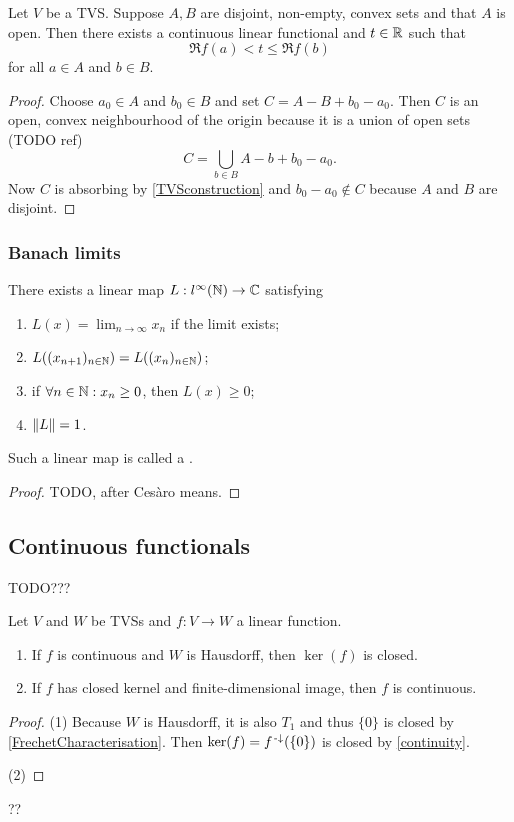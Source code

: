 \begin{proposition}
Let $V$ be a TVS. Suppose $A,B$ are disjoint, non-empty, convex sets and that $A$ is open. Then there exists a continuous linear functional and $t\in \mathbb{R}$ such that
\[ \Re f(a) < t \leq \Re f(b) \]
for all $a\in A$ and $b\in B$.
\end{proposition}
\begin{proof}
Choose $a_0\in A$ and $b_0\in B$ and set $C = A - B + b_0 - a_0$. Then $C$ is an open, convex neighbourhood of the origin because it is a union of open sets (TODO ref)
\[ C = \bigcup_{b\in B}A - b + b_0 - a_0. \]
Now $C$ is absorbing by \ref{TVSconstruction} and $b_0 - a_0 \notin C$ because $A$ and $B$ are disjoint.
\end{proof}





\subsubsection{Banach limits}
\begin{proposition}
There exists a linear map $L:l^\infty(\mathbb{N}) \to \mathbb{C}$ satisfying
\begin{enumerate}
\item $\displaystyle L(x) = \lim_{n\to \infty}x_n$ if the limit exists;
\item $L((x_{n+1})_{n\in\mathbb{N}}) = L((x_n)_{n\in\mathbb{N}})$;
\item if $\forall n\in\mathbb{N}:x_n\geq 0$, then $L(x) \geq 0$;
\item $\lVert L\rVert = 1$.
\end{enumerate}
Such a linear map is called a .
\end{proposition}
\begin{proof}
TODO, after Cesàro means.
\end{proof}

\subsection{Continuous functionals}

TODO???
\begin{proposition}
Let $V$ and $W$ be TVSs and $f: V\to W$ a linear function.
\begin{enumerate}
\item If $f$ is continuous and $W$ is Hausdorff, then $\ker(f)$ is closed.
\item If $f$ has closed kernel and finite-dimensional image, then $f$ is continuous.
\end{enumerate}
\end{proposition}
\begin{proof}
(1) Because $W$ is Hausdorff, it is also $T_1$ and thus $\{0\}$ is closed by \ref{FrechetCharacterisation}. Then $\ker(f) = f^{{\text{\hspace{0.15em}-}\downarrow}}(\{0\})$ is closed by \ref{continuity}.

(2) 
\end{proof}
??



